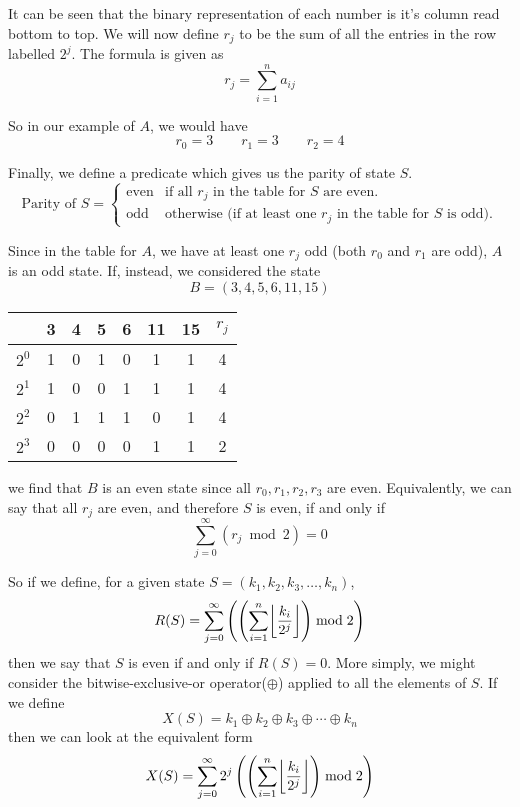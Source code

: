\documentclass[12pt]{article}
\DeclarePairedDelimiter{\floor}{\lfloor}{\rfloor}
\begin{document}
It can be seen that the binary representation of each number is it's column read bottom to top. We will now define $r_j$ to be the sum of all the entries in the row labelled $2^j$. The formula is given as
\[r_j = \sum_{i=1}^n a_{ij}\]

So in our example of $A$, we would have
\[r_0 = 3 \qquad r_1 = 3 \qquad r_2 = 4 \]

Finally, we define a predicate which gives us the parity of state $S$.
\[
    \text{Parity of } S = 
    \begin{cases}
        \text{even} & \text{if all $r_j$ in the table for $S$ are even.}\\
        \text{odd} & \text{otherwise (if at least one $r_j$ in the table for $S$ is odd).}
    \end{cases}
\]

Since in the table for $A$, we have at least one $r_j$ odd (both $r_0$ and $r_1$ are odd), $A$ is an odd state. If, instead, we considered the state
\[B = (3,4,5,6,11,15)\]
\begin{center}
    \begin{tabular}{c|cccccc|c}
         & 3 & 4 & 5 & 6 & 11 & 15 & $r_j$ \\
         \hline
        \cellcolor{white} $2^0$ & 1 & 0 & 1 & 0 & 1 & 1 & 4 \\
        \cellcolor{white} $2^1$ & 1 & 0 & 0 & 1 & 1 & 1 & 4 \\
        \cellcolor{white} $2^2$ & 0 & 1 & 1 & 1 & 0 & 1 & 4 \\
        \cellcolor{white} $2^3$ & 0 & 0 & 0 & 0 & 1 & 1 & 2
    \end{tabular}
\end{center}
we find that $B$ is an even state since all $r_0, r_1, r_2, r_3$ are even. Equivalently, we can say that all $r_j$ are even, and therefore $S$ is even, if and only if 
\[\sum_{j=0}^\infty(r_j \bmod 2) = 0\]

So if we define, for a given state $S = (k_1, k_2, k_3, \dots, k_n)$,
\[R(S) = \sum_{j=0}^\infty\left(\left(\sum_{i=1}^n \floor*{\frac{k_i}{2^j}}\right) \bmod 2\right)\]
then we say that $S$ is even if and only if $R(S) = 0$. More simply, we might consider the bitwise-exclusive-or operator($\oplus$) applied to all the elements of $S$. If we define
\[X(S) = k_1 \oplus k_2 \oplus k_3 \oplus \cdots \oplus k_n\]
then we can look at the equivalent form
\[X(S) = \sum_{j=0}^\infty 2^j \left(\left(\sum_{i=1}^n \floor*{\frac{k_i}{2^j}}\right) \bmod 2\right)\]
\end{document}
